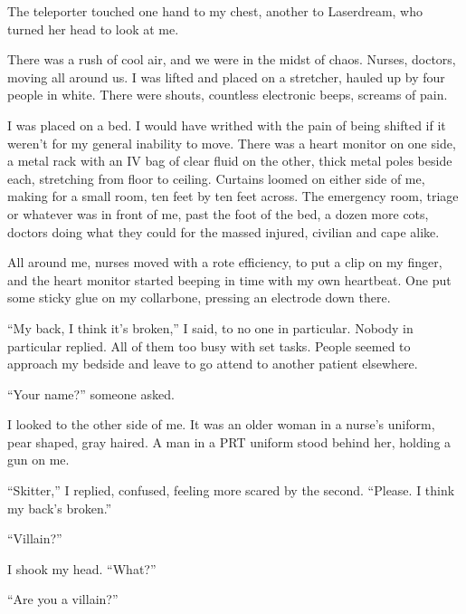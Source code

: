The teleporter touched one hand to my chest, another to Laserdream, who turned her head to look at me.



There was a rush of cool air, and we were in the midst of chaos.  Nurses, doctors, moving all around us.  I was lifted and placed on a stretcher, hauled up by four people in white.  There were shouts, countless electronic beeps, screams of pain.



I was placed on a bed.  I would have writhed with the pain of being shifted if it weren't for my general inability to move.  There was a heart monitor on one side, a metal rack with an IV bag of clear fluid on the other, thick metal poles beside each, stretching from floor to ceiling.  Curtains loomed on either side of me, making for a small room, ten feet by ten feet across. The emergency room, triage or whatever was in front of me, past the foot of the bed, a dozen more cots, doctors doing what they could for the massed injured, civilian and cape alike.



All around me, nurses moved with a rote efficiency, to put a clip on my finger, and the heart monitor started beeping in time with my own heartbeat.  One put some sticky glue on my collarbone, pressing an electrode down there.



``My back, I think it's broken,'' I said, to no one in particular.  Nobody in particular replied.  All of them too busy with set tasks.  People seemed to approach my bedside and leave to go attend to another patient elsewhere.



``Your name?'' someone asked.



I looked to the other side of me.  It was an older woman in a nurse's uniform, pear shaped, gray haired.  A man in a PRT uniform stood behind her, holding a gun on me.



``Skitter,'' I replied, confused, feeling more scared by the second.  ``Please.  I think my back's broken.''



``Villain?''



I shook my head.  ``What?''



``Are you a villain?''



